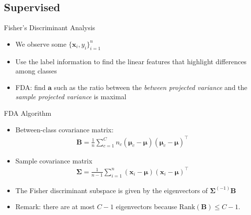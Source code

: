 \documentclass[10pt,aspectratio=1610]{beamer}
\begin{document}
\subsection{Supervised}
\label{sec:orgd79032b}
\begin{frame}[label={sec:org2454406}]{Fisher's Discriminant Analysis}
\begin{itemize}
\item We observe some \(\{\mathbf{x}_i,y_i\}_{i=1}^n\)
\item Use the label information to find the linear features that highlight differences among classes

\begin{center}
\end{center}
\item FDA: find \(\mathbf{a}\) such as the ratio between the \emph{between projected variance} and the \emph{sample projected variance} is maximal
\end{itemize}
\end{frame}
\begin{frame}[label={sec:org4d75b46}]{FDA Algorithm}
\begin{itemize}
\item Between-class covariance matrix:
\begin{eqnarray*}
  \mathbf{B} = \frac{1}{n}\sum_{c=1}^Cn_c(\boldsymbol{\mu}_c-\boldsymbol{\mu})(\boldsymbol{\mu}_c-\boldsymbol{\mu})^\top
\end{eqnarray*}
\item Sample covariance matrix
\begin{eqnarray*}
  \boldsymbol{\Sigma} = \frac{1}{n-1}\sum_{i=1}^n(\mathbf{x}_i-\boldsymbol{\mu})(\mathbf{x}_i-\boldsymbol{\mu})^\top
\end{eqnarray*}
\item The Fisher discriminant subspace is given by the eigenvectors of \(\boldsymbol{\Sigma}^{(-1)}\mathbf{B}\)
\item Remark: there are at most \(C-1\) eigenvectors because \(\text{Rank}(\mathbf{B})\leq C-1\).
\end{itemize}
\end{frame}
\end{document}
